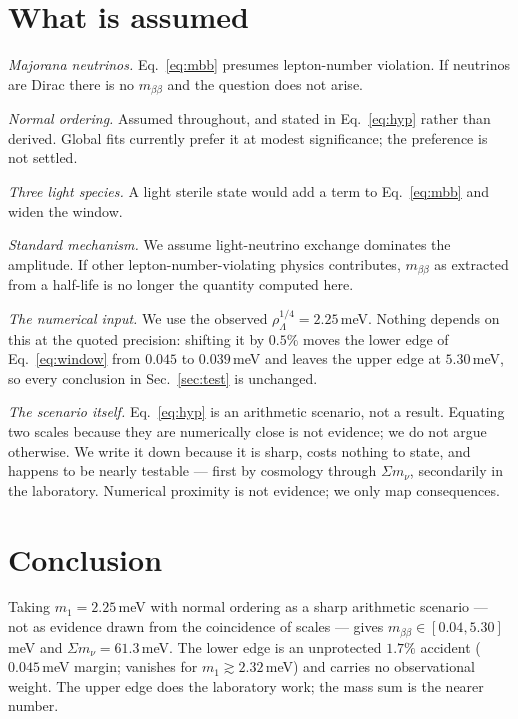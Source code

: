 \documentclass[aps,prd,twocolumn,superscriptaddress,nofootinbib,10pt]{revtex4-2}
\begin{document}
\section{What is assumed}\label{sec:assume}

\emph{Majorana neutrinos.} Eq.~\eqref{eq:mbb} presumes lepton-number violation. If neutrinos are
Dirac there is no $m_{\beta\beta}$ and the question does not arise.

\emph{Normal ordering.} Assumed throughout, and stated in Eq.~\eqref{eq:hyp} rather than derived.
Global fits currently prefer it at modest significance; the preference is not settled.

\emph{Three light species.} A light sterile state would add a term to Eq.~\eqref{eq:mbb} and widen
the window.

\emph{Standard mechanism.} We assume light-neutrino exchange dominates the amplitude. If other
lepton-number-violating physics contributes, $m_{\beta\beta}$ as extracted from a half-life is no
longer the quantity computed here.

\emph{The numerical input.} We use the observed $\rho_\Lambda^{1/4} = 2.25\,$meV. Nothing depends
on this at the quoted precision: shifting it by $0.5\%$ moves the lower edge of
Eq.~\eqref{eq:window} from $0.045$ to $0.039\,$meV and leaves the upper edge at $5.30\,$meV, so
every conclusion in Sec.~\ref{sec:test} is unchanged.

\emph{The scenario itself.} Eq.~\eqref{eq:hyp} is an arithmetic scenario, not a result. Equating
two scales because they are numerically close is not evidence; we do not argue otherwise. We write
it down because it is sharp, costs nothing to state, and happens to be nearly testable --- first by
cosmology through $\Sigma m_\nu$, secondarily in the laboratory. Numerical proximity is not
evidence; we only map consequences.

\section{Conclusion}

Taking $m_1 = 2.25\,$meV with normal ordering as a sharp arithmetic scenario --- not as evidence
drawn from the coincidence of scales --- gives $m_{\beta\beta} \in [0.04, 5.30]\,$meV and
$\Sigma m_\nu = 61.3\,$meV. The lower edge is an unprotected $1.7\%$ accident ($0.045\,$meV margin;
vanishes for $m_1 \gtrsim 2.32\,$meV) and carries no observational weight. The upper edge does the
laboratory work; the mass sum is the nearer number.
\end{document}
